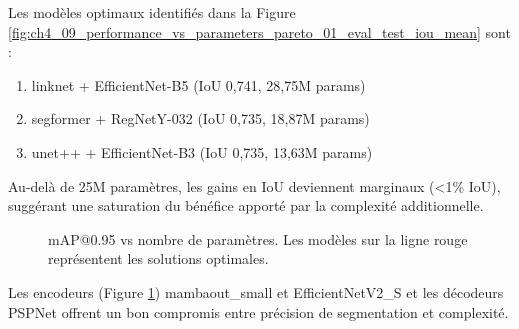 Les modèles optimaux identifiés dans la Figure \ref{fig:ch4_09_performance_vs_parameters_pareto_01_eval_test_iou_mean} sont :
\begin{enumerate}
    \item linknet + EfficientNet-B5 (IoU 0,741, 28,75M params)
    \item segformer + RegNetY-032 (IoU 0,735, 18,87M params)
    \item unet++ + EfficientNet-B3 (IoU 0,735, 13,63M params)
\end{enumerate}

Au-delà de 25M paramètres, les gains en IoU deviennent marginaux (<1\% IoU), suggérant une saturation du bénéfice apporté par la complexité additionnelle.

\begin{figure}[H]
    \centering
    \caption{mAP@0.95 vs nombre de paramètres. Les modèles sur la ligne rouge représentent les solutions optimales.}
    \label{fig:ch4_09_performance_vs_parameters_pareto_04_eval_test_map_95_mean}
\end{figure}

Les encodeurs (Figure \ref{fig:ch4_09_performance_vs_parameters_pareto_04_eval_test_map_95_mean}) mambaout\_small et EfficientNetV2\_S et les décodeurs PSPNet offrent un bon compromis entre précision de segmentation et complexité. 

